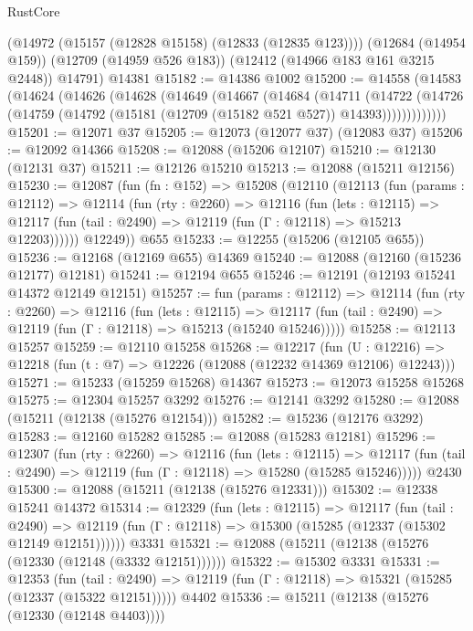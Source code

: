 \begin{lexlean}{RustCore}
\begin{coremodule}
      (@14972 (@15157 (@12828 @15158) (@12833 (@12835 @123))))
      (@12684 (@14954 @159))
      (@12709 (@14959 @526 @183))
      (@12412 (@14966 @183 @161 @3215 @2448))
      @14791)
    @14381
@15182 := @14386 @1002
@15200 := @14558
    (@14583
      (@14624
        (@14626
          (@14628
            (@14649
              (@14667
                (@14684
                  (@14711
                    (@14722
                      (@14726
                        (@14759 (@14792 (@15181 (@12709 (@15182 @521 @527)) @14393)))))))))))))
@15201 := @12071 @37
@15205 := @12073 (@12077 @37) (@12083 @37)
@15206 := @12092 @14366
@15208 := @12088 (@15206 @12107)
@15210 := @12130 (@12131 @37)
@15211 := @12126 @15210
@15213 := @12088 (@15211 @12156)
@15230 := @12087
    (fun (fn : @152) =>
    @15208
      (@12110
        (@12113
          (fun (params : @12112) =>
          @12114
            (fun (rty : @2260) =>
            @12116
              (fun (lets : @12115) =>
              @12117 (fun (tail : @2490) => @12119 (fun (Γ : @12118) => @15213 @12203))))))
        @12249))
    @655
@15233 := @12255 (@15206 (@12105 @655))
@15236 := @12168 (@12169 @655) @14369
@15240 := @12088 (@12160 (@15236 @12177) @12181)
@15241 := @12194 @655
@15246 := @12191 (@12193 @15241 @14372 @12149 @12151)
@15257 := fun (params : @12112) =>
  @12114
    (fun (rty : @2260) =>
    @12116
      (fun (lets : @12115) =>
      @12117 (fun (tail : @2490) => @12119 (fun (Γ : @12118) => @15213 (@15240 @15246)))))
@15258 := @12113 @15257
@15259 := @12110 @15258
@15268 := @12217
    (fun (U : @12216) => @12218 (fun (t : @7) => @12226 (@12088 (@12232 @14369 @12106) @12243)))
@15271 := @15233 (@15259 @15268) @14367
@15273 := @12073 @15258 @15268
@15275 := @12304 @15257 @3292
@15276 := @12141 @3292
@15280 := @12088 (@15211 (@12138 (@15276 @12154)))
@15282 := @15236 (@12176 @3292)
@15283 := @12160 @15282
@15285 := @12088 (@15283 @12181)
@15296 := @12307
    (fun (rty : @2260) =>
    @12116
      (fun (lets : @12115) =>
      @12117 (fun (tail : @2490) => @12119 (fun (Γ : @12118) => @15280 (@15285 @15246)))))
    @2430
@15300 := @12088 (@15211 (@12138 (@15276 @12331)))
@15302 := @12338 @15241 @14372
@15314 := @12329
    (fun (lets : @12115) =>
    @12117
      (fun (tail : @2490) =>
      @12119 (fun (Γ : @12118) => @15300 (@15285 (@12337 (@15302 @12149 @12151))))))
    @3331
@15321 := @12088 (@15211 (@12138 (@15276 (@12330 (@12148 (@3332 @12151))))))
@15322 := @15302 @3331
@15331 := @12353
    (fun (tail : @2490) => @12119 (fun (Γ : @12118) => @15321 (@15285 (@12337 (@15322 @12151)))))
    @4402
@15336 := @15211 (@12138 (@15276 (@12330 (@12148 @4403))))

\end{coremodule}
\end{lexlean}
